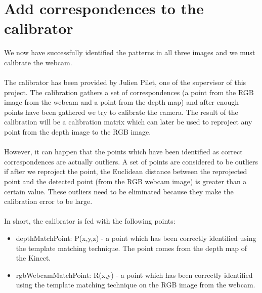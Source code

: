 \section{Add correspondences to the calibrator}
\noindent
We now have successfully identified the patterns in all three images and we must calibrate the webcam. 
\\\\
The calibrator has been provided by Julien Pilet, one of the supervisor of this project. The calibration gathers a set of correspondences (a point from the RGB image from the webcam and a point from the depth map) and after enough points have been gathered we try to calibrate the camera. The result of the calibration will be a calibration matrix which can later be used to reproject any point from the depth image to the RGB image. 
\\\\
However, it can happen that the points which have been identified as correct correspondences are actually outliers. A set of points are considered to be outliers if after we reproject the point, the Euclidean distance between the reprojected point and the detected point (from the RGB webcam image) is greater than a certain value. These outliers need to be eliminated because they make the calibration error to be large. 
\\\\
In short, the calibrator is fed with the following points:
\begin{itemize}
	\item depthMatchPoint: P(x,y,z) - a point which has been correctly identified using the template matching technique. The point comes from the depth map of the Kinect.
	\item rgbWebcamMatchPoint: R(x,y) - a point which has been correctly identified using the template matching technique on the RGB image from the webcam. 
\end{itemize}  

